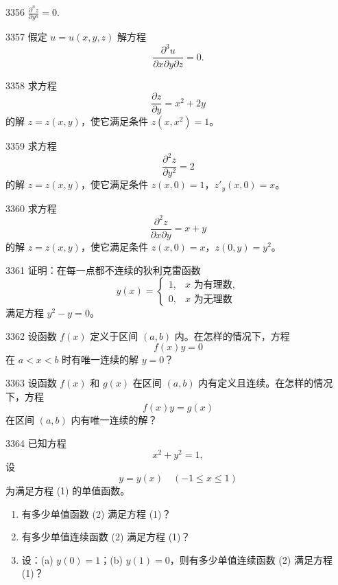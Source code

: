 \begin{prob}[S]{3356}
$\frac{\partial^n z}{\partial y^n} = 0$.
\end{prob}

\begin{prob}[S]{3357}
假定 $u = u(x, y, z)$ 解方程
\[
\frac{\partial^3 u}{\partial x \partial y \partial z} = 0.
\]
\end{prob}

\begin{prob}[M]{3358}
求方程
\[
\frac{\partial z}{\partial y} = x^2 + 2y
\]
的解 $z = z(x, y)$，使它满足条件 $z(x, x^2) = 1$。
\end{prob}

\begin{prob}[M]{3359}
求方程
\[
\frac{\partial^2 z}{\partial y^2} = 2
\]
的解 $z = z(x, y)$，使它满足条件 $z(x, 0) = 1$，$z'_y(x, 0) = x$。
\end{prob}

\begin{prob}[M]{3360}
求方程
\[
\frac{\partial^2 z}{\partial x \partial y} = x + y
\]
的解 $z = z(x, y)$，使它满足条件 $z(x, 0) = x$，$z(0, y) = y^2$。
\end{prob}


\begin{prob}[M]{3361}
证明：在每一点都不连续的狄利克雷函数
\[
y(x) = \begin{cases}
1, & x\text{ 为有理数}, \\
0, & x\text{ 为无理数}
\end{cases}
\]
满足方程 $y^2 - y = 0$。
\end{prob}

\begin{prob}[M]{3362}
设函数 $f(x)$ 定义于区间 $(a, b)$ 内。在怎样的情况下，方程
\[
f(x)y = 0
\]
在 $a < x < b$ 时有唯一连续的解 $y = 0$？
\end{prob}

\begin{prob}[M]{3363}
设函数 $f(x)$ 和 $g(x)$ 在区间 $(a, b)$ 内有定义且连续。在怎样的情况下，方程
\[
f(x)y = g(x)
\]
在区间 $(a, b)$ 内有唯一连续的解？
\end{prob}

\begin{prob}[L]{3364}
已知方程
\[
x^2 + y^2 = 1, \tag{1}
\]
设
\[
y = y(x) \quad (-1 \leqslant x \leqslant 1) \tag{2}
\]
为满足方程 (1) 的单值函数。
\begin{enumerate}[label=\arabic*), itemsep=2pt, topsep=3pt]
  \item 有多少单值函数 (2) 满足方程 (1)？
  \item 有多少单值连续函数 (2) 满足方程 (1)？
  \item 设：(a) $y(0) = 1$；(b) $y(1) = 0$，则有多少单值连续函数 (2) 满足方程 (1)？
\end{enumerate}
\end{prob}

